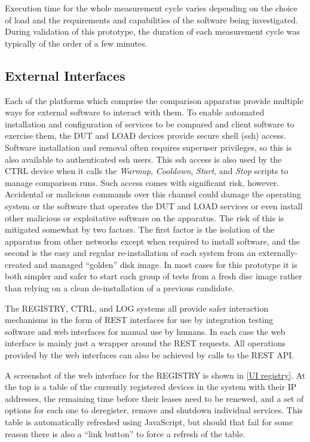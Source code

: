Execution time for the whole measurement cycle varies depending on the choice of load and the requirements and capabilities of the software being investigated. During validation of this prototype, the duration of each measurement cycle was typically of the order of a few minutes.

\subsection{External Interfaces}
\label{Web UI}

Each of the platforms which comprise the comparison apparatus provide multiple ways for external software to interact with them. To enable automated installation and configuration of services to be compared and client software to exercise them, the DUT and LOAD devices provide secure shell (ssh) access. Software installation and removal often requires superuser privileges, so this is also available to authenticated ssh users. This ssh access is also used by the CTRL device when it calls the \emph{Warmup}, \emph{Cooldown}, \emph{Start}, and \emph{Stop} scripts to manage comparison runs. Such access comes with significant risk, however. Accidental or malicious commands over this channel could damage the operating system or the software that operates the DUT and LOAD services or even install other malicious or exploitative software on the apparatus. The risk of this is mitigated somewhat by two factors. The first factor is the isolation of the apparatus from other networks except when required to install software, and the second is the easy and regular re-installation of each system from an externally-created and managed \enquote{golden} disk image. In most cases for this prototype it is both simpler and safer to start each group of tests from a fresh disc image rather than relying on a clean de-installation of a previous candidate.

The REGISTRY, CTRL, and LOG systems all provide safer interaction mechanisms in the form of REST interfaces for use by integration testing software and web interfaces for manual use by humans. In each case the web interface is mainly just a wrapper around the REST requests. All operations provided by the web interfaces can also be achieved by calls to the REST API.

A screenshot of the web interface for the REGISTRY is shown in \autoref{UI registry}. At the top is a table of the currently registered devices in the system with their IP addresses, the remaining time before their leases need to be renewed, and a set of options for each one to deregister, remove and shutdown individual services. This table is automatically refreshed using JavaScript, but should that fail for some reason there is also a \enquote{link button} to force a refresh of the table.

